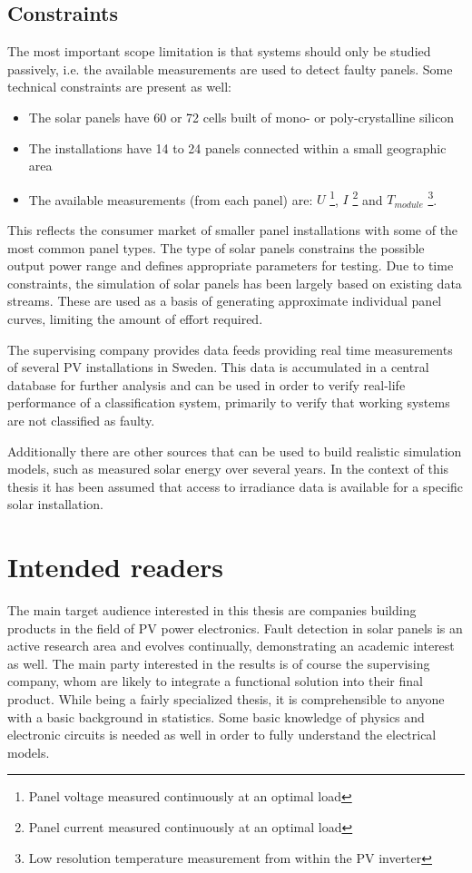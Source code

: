 \subsection*{Constraints}
The most important scope limitation is that systems should only be studied passively, i.e. the available measurements are used to detect faulty panels.  
Some technical constraints are present as well:
\begin{itemize}
\item The solar panels have 60 or 72 cells built of mono- or poly-crystalline silicon
\item The installations have 14 to 24 panels connected within a small geographic area
\item The available measurements (from each panel) are:
$U$ \footnote{Panel voltage measured continuously at an optimal load},
$I$ \footnote{Panel current measured continuously at an optimal load} and
$T_{module}$ \footnote{Low resolution temperature measurement from within the PV inverter}.

\end{itemize}

This reflects the consumer market of smaller panel installations with some of the most common panel types.
The type of solar panels constrains the possible output power range and defines appropriate parameters for testing.
Due to time constraints, the simulation of solar panels has been largely based on existing data streams.
These are used as a basis of generating approximate individual panel curves, limiting the amount of effort required.

The supervising company provides data feeds providing real time measurements of several PV installations in Sweden.
This data is accumulated in a central database for further analysis and
can be used in order to verify real-life performance of a classification system, primarily to verify that working systems are not classified as faulty.

Additionally there are other sources that can be used to build realistic simulation models, such as measured solar energy over several years.
In the context of this thesis it has been assumed that access to irradiance data is available for a specific solar installation.

\section{Intended readers}
The main target audience interested in this thesis are companies building products in the field of PV power electronics.
Fault detection in solar panels is an active research area and evolves continually, demonstrating an academic interest as well.
The main party interested in the results is of course the supervising company, whom are likely to
integrate a functional solution into their final product.
While being a fairly specialized thesis, it is comprehensible to anyone with a basic background in statistics.
Some basic knowledge of physics and electronic circuits is needed as well in order to fully understand the electrical models.

